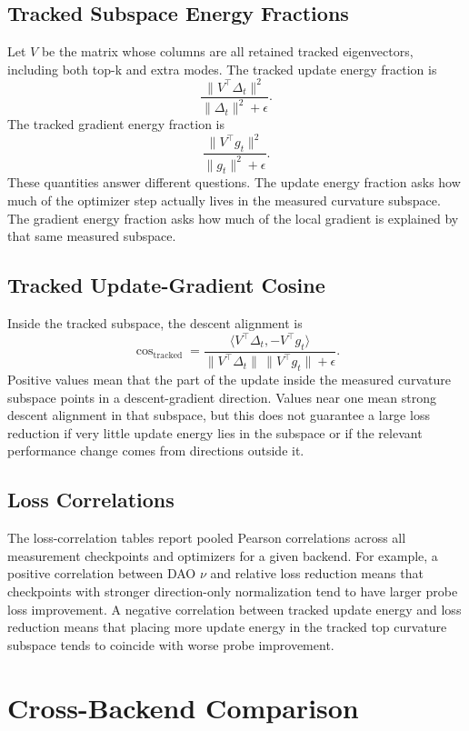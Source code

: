 \documentclass[11pt]{article}
\begin{document}
\subsection{Tracked Subspace Energy Fractions}

Let $V$ be the matrix whose columns are all retained tracked eigenvectors,
including both top-k and extra modes. The tracked update energy fraction is
\[
    \frac{\|V^\top \Delta_t\|^2}{\|\Delta_t\|^2 + \epsilon}.
\]
The tracked gradient energy fraction is
\[
    \frac{\|V^\top g_t\|^2}{\|g_t\|^2 + \epsilon}.
\]
These quantities answer different questions. The update energy fraction asks
how much of the optimizer step actually lives in the measured curvature
subspace. The gradient energy fraction asks how much of the local gradient is
explained by that same measured subspace.

\subsection{Tracked Update-Gradient Cosine}

Inside the tracked subspace, the descent alignment is
\[
    \cos_{\mathrm{tracked}}
    =
    \frac{\langle V^\top \Delta_t, -V^\top g_t \rangle}
         {\|V^\top \Delta_t\| \, \|V^\top g_t\| + \epsilon}.
\]
Positive values mean that the part of the update inside the measured curvature
subspace points in a descent-gradient direction. Values near one mean strong
descent alignment in that subspace, but this does not guarantee a large loss
reduction if very little update energy lies in the subspace or if the relevant
performance change comes from directions outside it.

\subsection{Loss Correlations}

The loss-correlation tables report pooled Pearson correlations across all
measurement checkpoints and optimizers for a given backend. For example, a
positive correlation between DAO $\nu$ and relative loss reduction means that
checkpoints with stronger direction-only normalization tend to have larger
probe loss improvement. A negative correlation between tracked update energy
and loss reduction means that placing more update energy in the tracked top
curvature subspace tends to coincide with worse probe improvement.

\section{Cross-Backend Comparison}
\end{document}
